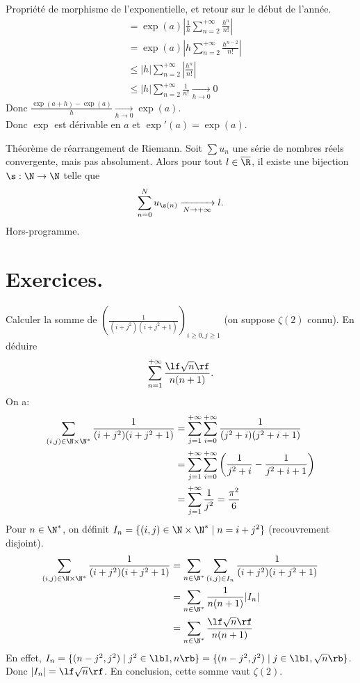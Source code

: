 \documentclass[11pt]{article}
\begin{document}
\begin{ex}{Propriété de morphisme de l'exponentielle, et retour sur le début de l'année.}{}
\begin{align*}
        &=\exp(a)\left| \frac{1}{h}\sum\limits_{n=2}^{+\infty}\frac{h^n}{n!} \right|\\
        &=\exp(a)\left| h\sum_{n=2}^{+\infty}\frac{h^{n-2}}{n!} \right|\\
        &\leq |h|\sum_{n=2}^{+\infty}\left|\frac{h^n}{n!}\right|\\
        &\leq |h|\sum_{n=2}^{+\infty}\frac{1}{n!} \xrightarrow[h\to0]{} 0
    \end{align*}
    Donc $\frac{\exp(a+h)-\exp(a)}{h}\xrightarrow[h\to0]{}\exp(a)$.\\
    Donc $\exp$ est dérivable en $a$ et $\exp'(a)=\exp(a)$. 
\end{ex}

\pagebreak

\begin{thm}{Théorème de réarrangement de Riemann.}{}
    Soit $\sum u_n$ une série de nombres réels convergente, mais pas absolument. Alors pour tout $l\in\overline{\R}$, il existe une bijection $\s:\N\to\N$ telle que \begin{equation*}\sum_{n=0}^Nu_{\s(n)}\xrightarrow[N\to+\infty]{}l.\end{equation*}
    \tcblower
    Hors-programme.
\end{thm}

\section{Exercices.}

\begin{exercice}{}{}
    Calculer la somme de \Large$\left( \frac{1}{(i+j^2)(i+j^2+1)} \right)_{i\geq 0,j\geq1}$ \normalsize (on suppose $\zeta(2)$ connu). En déduire
    \begin{equation*}
        \sum_{n=1}^{+\infty}\frac{\lf \sqrt{n} \rf}{n(n+1)}.
    \end{equation*}
    \tcblower
    On a:
    \begin{align*}
        \sum_{(i,j)\in\N\times\N^*}\frac{1}{(i+j^2)(i+j^2+1)}&=\sum_{j=1}^{+\infty}\sum_{i=0}^{+\infty}\frac{1}{(j^2+i)(j^2+i+1)}\\
        &=\sum_{j=1}^{+\infty}\sum_{i=0}^{+\infty}\left( \frac{1}{j^2+i}-\frac{1}{j^2+i+1} \right)\\
        &=\sum_{j=1}^{+\infty}\frac{1}{j^2}=\frac{\pi^2}{6}
    \end{align*}
    Pour $n\in\N^*$, on définit $I_n=\{(i,j)\in\N\times\N^*\mid n=i+j^2\}$ (recouvrement disjoint).
    \begin{align*}
        \sum_{(i,j)\in\N\times\N^*}\frac{1}{(i+j^2)(i+j^2+1)}&=\sum_{n\in\N^*}\sum_{(i,j)\in I_n}\frac{1}{(i+j^2)(i+j^2+1)}\\
        &=\sum_{n\in\N^*}\frac{1}{n(n+1)}|I_n|\\
        &=\sum_{n\in\N^*}\frac{\lf \sqrt{n} \rf}{n(n+1)}
    \end{align*}
    En effet, $I_n=\{(n-j^2,j^2)\mid j^2\in\lb1,n\rb\}=\{(n-j^2,j^2)\mid j\in\lb1,\sqrt{n}\rb\}$. Donc $|I_n|=\lf\sqrt{n}\rf$.\n
    En conclusion, cette somme vaut $\zeta(2)$.
\end{exercice}
\end{document}
